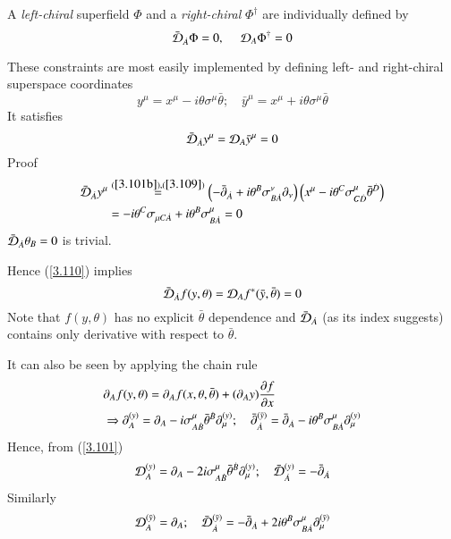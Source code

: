 A \textit{left-chiral} superfield $\Phi$ and a \textit{right-chiral} $\Phi^\dagger$ are individually  defined by
\begin{equation}
   \bar{\mathcal{D}}_{\dot{A}} \Phi = 0,\; \quad \mathcal{D}_A \Phi^\dagger = 0 \label{3.108}
\end{equation}

These constraints are most easily implemented by defining left- and right-chiral superspace coordinates
\begin{equation}
   y^\mu = x^\mu - i \theta \sigma^\mu \bar\theta;\quad \bar{y}^{\mu} = x^\mu + i\theta \sigma^\mu \bar\theta \label{3.109}
\end{equation}
It satisfies
\begin{equation}
   \bar{\mathcal{D}}_{\dot{A}} y^\mu = \mathcal{D}_A \bar{y}^\mu = 0\label{3.110}
\end{equation}
Proof 
\begin{align*}
   \bar{\mathcal{D}}_{\dot{A}} y^\mu &\stackrel{(\ref{3.101b}), (\ref{3.109})}{=} \left( - \bar\partial_{\dot{A}} + i \theta^B \sigma^\nu_{B\dot{A}}\partial_\nu \right) \left( x^\mu - i\theta^C\sigma^\mu_{C\dot{D}} \bar\theta^{\dot{D}} \right) \\
                            &= - i \theta^C \sigma_{\mu C \dot{A}} + i \theta^B \sigma^\mu_{B\dot{A}} = 0
\end{align*}
$\bar{\mathcal{D}}_{\dot{A}} \theta_B = 0$ is trivial.

Hence  (\ref{3.110}) implies
\begin{equation}
   \bar{\mathcal{D}}_{\dot{A}} f(y,\theta) = \mathcal{D}_A f^*(\bar{y},\bar{\theta}) = 0 \label{3.111}
\end{equation}
Note that $f(y,\theta)$ has no explicit $\bar\theta$ dependence and $\bar {\mathcal{D}}_{\dot{A}}$ (as its index suggests) contains only derivative with respect to $\bar\theta$.

It can also be seen by applying the chain rule
\begin{align*}
   &\partial_A f(y,\theta) = \partial_A f(x, \theta,\bar\theta) + (\partial_A y) \pdv{f}{x} \\
   &\Rightarrow \partial_A^{(y)} = \partial_A - i \sigma^\mu_{A\dot{B}} \bar\theta^{\dot{B}} \partial_\mu^{(y)}; \quad \bar\partial_{\dot{A}}^{(\bar{y})} = \bar{\partial}_{\dot{A}} - i \theta^B \sigma^\mu_{B \dot{A}} \partial_\mu^{(y)}
\end{align*}
Hence, from (\ref{3.101})
\begin{equation}
   \mathcal{D}_A^{(y)} = \partial_A - 2 i \sigma^\mu_{A\dot{B}} \bar\theta^{\dot{B}} \partial_\mu^{(y)};\quad \bar{\mathcal{D}}_{\dot{A}}^{(y)} = - \bar\partial_{\dot{A}} \label{3.112}
\end{equation}
Similarly
\begin{equation}
   \mathcal{D}_A^{(\bar{y})} = \partial_A ; \quad \bar{\mathcal{D}}_{\dot{A}}^{(\bar{y})} = - \bar\partial_{\dot{A}} + 2i \theta^B \sigma^\mu_{B\dot{A}} \partial_\mu^{(\bar{y})}
\end{equation}

